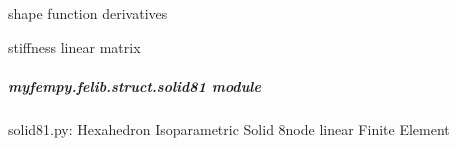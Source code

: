 \documentclass[letterpaper,10pt,english]{sphinxmanual}
\begin{document}
\begin{fulllineitems}
\begin{fulllineitems}
\label{\detokenize{myfempy.felib.struct:myfempy.felib.struct.solid41.Solid41.matriz_b}}
\pysigstartsignatures
{}
\pysigstopsignatures
\sphinxAtStartPar
shape function derivatives

\end{fulllineitems}


\begin{fulllineitems}
\label{\detokenize{myfempy.felib.struct:myfempy.felib.struct.solid41.Solid41.stiff_linear}}
\pysigstartsignatures
{}
\pysigstopsignatures
\sphinxAtStartPar
stiffness linear matrix

\end{fulllineitems}


\end{fulllineitems}



\subparagraph{myfempy.felib.struct.solid81 module}
\label{\detokenize{myfempy.felib.struct:module-myfempy.felib.struct.solid81}}\label{\detokenize{myfempy.felib.struct:myfempy-felib-struct-solid81-module}}
\sphinxAtStartPar
solid81.py: Hexahedron Isoparametric Solid 8\sphinxhyphen{}node linear Finite Element
\end{document}
